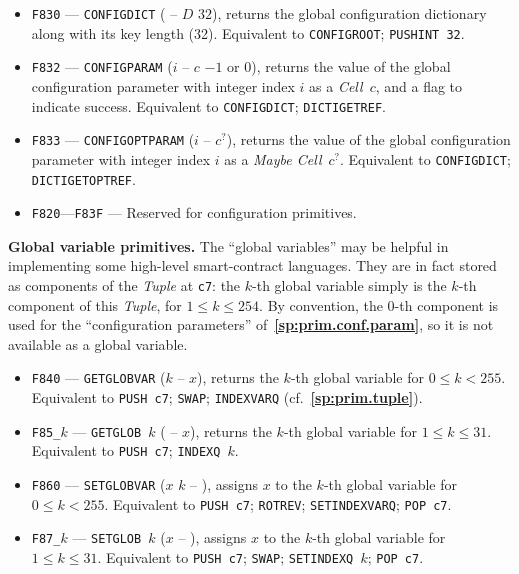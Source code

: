\documentclass[12pt,oneside]{article}
\def\makepoint#1{\medbreak\noindent{\bf #1.\ }}
\def\nxsubpoint{\refstepcounter{subsubsection}%
    \smallbreak\makepoint{\thesubsubsection}}
\def\refpoint#1{{\rm\textbf{\ref{#1}}}}
\let\ptref=\refpoint
\def\emb#1{\textbf{#1.}}
\begin{document}
\begin{itemize}
\item {\tt F830} --- {\tt CONFIGDICT} ( -- $D$ $32$), returns the global configuration dictionary along with its key length (32). Equivalent to {\tt CONFIGROOT}; {\tt PUSHINT 32}.
\item {\tt F832} --- {\tt CONFIGPARAM} ($i$ -- $c$ $-1$ or $0$), returns the value of the global configuration parameter with integer index $i$ as a {\em Cell\/}~$c$, and a flag to indicate success. Equivalent to {\tt CONFIGDICT}; {\tt DICTIGETREF}.
\item {\tt F833} --- {\tt CONFIGOPTPARAM} ($i$ -- $c^?$), returns the value of the global configuration parameter with integer index $i$ as a {\em Maybe Cell\/}~$c^?$. Equivalent to {\tt CONFIGDICT}; {\tt DICTIGETOPTREF}.
\item {\tt F820}---{\tt F83F} --- Reserved for configuration primitives.
\end{itemize}

\nxsubpoint\emb{Global variable primitives}
The ``global variables'' may be helpful in implementing some high-level smart-contract languages. They are in fact stored as components of the {\em Tuple\/} at {\tt c7}: the $k$-th global variable simply is the $k$-th component of this {\em Tuple}, for $1\leq k\leq 254$. By convention, the $0$-th component is used for the ``configuration parameters'' of~\ptref{sp:prim.conf.param}, so it is not available as a global variable.
\begin{itemize}
\item {\tt F840} --- {\tt GETGLOBVAR} ($k$ -- $x$), returns the $k$-th global variable for $0\leq k<255$. Equivalent to {\tt PUSH c7}; {\tt SWAP}; {\tt INDEXVARQ} (cf.~\ptref{sp:prim.tuple}).
\item {\tt F85\_$k$} --- {\tt GETGLOB $k$} ( -- $x$), returns the $k$-th global variable for $1\leq k\leq 31$. Equivalent to {\tt PUSH c7}; {\tt INDEXQ $k$}.
\item {\tt F860} --- {\tt SETGLOBVAR} ($x$ $k$ -- ), assigns $x$ to the $k$-th global variable for $0\leq k<255$. Equivalent to {\tt PUSH c7}; {\tt ROTREV}; {\tt SETINDEXVARQ}; {\tt POP c7}.
\item {\tt F87\_$k$} --- {\tt SETGLOB $k$} ($x$ -- ), assigns $x$ to the $k$-th global variable for $1\leq k\leq 31$. Equivalent to {\tt PUSH c7}; {\tt SWAP}; {\tt SETINDEXQ $k$}; {\tt POP c7}.
\end{itemize}
\end{document}
